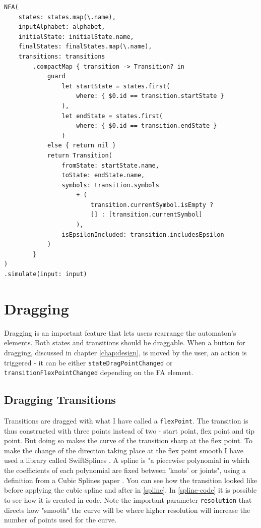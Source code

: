 \begin{lstlisting}[caption={\lstinline{NFA} initialization in \lstinline{AutomataLibrarryService}}, label=nfa-init]
NFA(
    states: states.map(\.name),
    inputAlphabet: alphabet,
    initialState: initialState.name,
    finalStates: finalStates.map(\.name),
    transitions: transitions
        .compactMap { transition -> Transition? in
            guard
                let startState = states.first(
                    where: { $0.id == transition.startState }
                ),
                let endState = states.first(
                    where: { $0.id == transition.endState }
                )
            else { return nil }
            return Transition(
                fromState: startState.name,
                toState: endState.name,
                symbols: transition.symbols
                    + (
                        transition.currentSymbol.isEmpty ? 
                        [] : [transition.currentSymbol]
                    ),
                isEpsilonIncluded: transition.includesEpsilon
            )
        }
)
.simulate(input: input)
\end{lstlisting}

\section{Dragging}

Dragging is an important feature that lets users rearrange the automaton's elements. Both states and transitions should be draggable. When a button for dragging, discussed in chapter \ref{chap:design}, is moved by the user, an action is triggered - it can be either \lstinline{stateDragPointChanged} or \lstinline{transitionFlexPointChanged} depending on the FA element.

\subsection{Dragging Transitions}

Transitions are dragged with what I have called a \lstinline{flexPoint}. The transition is thus constructed with three points instead of two - start point, flex point and tip point. But doing so makes the curve of the transition sharp at the flex point. To make the change of the direction taking place at the flex point smooth I have used a library called SwiftSplines \cite{swiftsplines}. A spline is "a piecewise polynomial in which the coefficients of each polynomial are fixed between 'knots' or joints", using a definition from a Cubic Splines paper \cite{cubic-splines}. You can see how the transition looked like before applying the cubic spline and after in \ref{spline}. In \ref{spline-code} it is possible to see how it is created in code. Note the important parameter \lstinline{resolution} that directs how "smooth" the curve will be where higher resolution will increase the number of points used for the curve.

